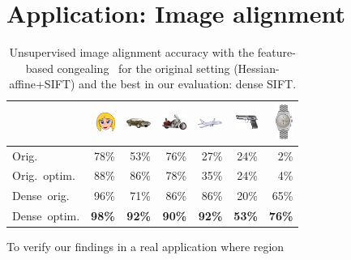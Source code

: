 \documentclass[10pt,journal,cspaper,compsoc]{IEEEtran}
\begin{document}
\section{Application: Image alignment}
%
\begin{table}[h]
  \caption{Unsupervised image alignment accuracy with
    the feature-based congealing~\cite{LanKam:2011} for the original
    setting (Hessian-affine+SIFT) and the best in our evaluation: dense SIFT.
  \label{tab:alignment}}
  \begin{center}
    \begin{tabular}{lrrrrrr}
      \toprule
      & \includegraphics[width=0.6cm]{resources/face.png}
      & \includegraphics[width=0.8cm]{resources/car_side.png}
      & \includegraphics[width=0.8cm]{resources/motorbike.png}
      & \includegraphics[width=0.8cm]{resources/airplane.png}
      & \includegraphics[width=0.7cm]{resources/revolver.png}
      & \includegraphics[trim=0 160 0 100, clip=true, width=0.6cm]{resources/watch.png} \\
      \midrule
      Orig.~\cite{LanKam:2011} 
      & 78\% & 53\% & 76\% & 27\% & 24\% &  2\% \\
      Orig.~optim. 
      & 88\% & 86\% & 78\% & 35\% & 24\% &  4\%\\
      Dense~orig. 
      & 96\% & 71\% & 86\% & 86\% & 20\% & 65\%\\
      Dense~optim. 
      & {\bf 98\%} & {\bf 92\%} & {\bf 90\%} & {\bf 92\%} & {\bf 53\%} & {\bf 76\%}\\
      \bottomrule
    \end{tabular}
  \end{center}
\end{table}
To verify our findings in a real application where region
\end{document}
